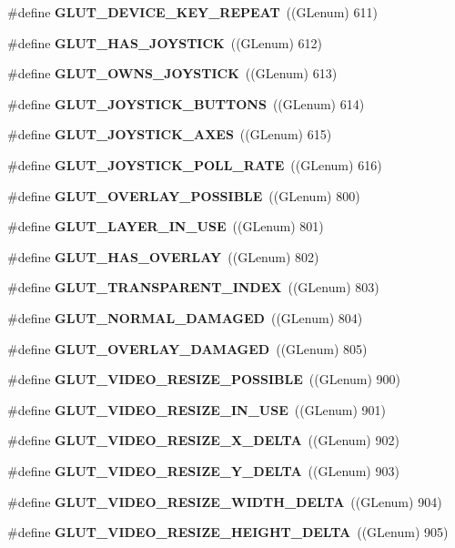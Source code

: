 \begin{DoxyCompactItemize}
\item 
\#define {\bf G\+L\+U\+T\+\_\+\+D\+E\+V\+I\+C\+E\+\_\+\+K\+E\+Y\+\_\+\+R\+E\+P\+E\+AT}~((G\+Lenum) 611)
\item 
\#define {\bf G\+L\+U\+T\+\_\+\+H\+A\+S\+\_\+\+J\+O\+Y\+S\+T\+I\+CK}~((G\+Lenum) 612)
\item 
\#define {\bf G\+L\+U\+T\+\_\+\+O\+W\+N\+S\+\_\+\+J\+O\+Y\+S\+T\+I\+CK}~((G\+Lenum) 613)
\item 
\#define {\bf G\+L\+U\+T\+\_\+\+J\+O\+Y\+S\+T\+I\+C\+K\+\_\+\+B\+U\+T\+T\+O\+NS}~((G\+Lenum) 614)
\item 
\#define {\bf G\+L\+U\+T\+\_\+\+J\+O\+Y\+S\+T\+I\+C\+K\+\_\+\+A\+X\+ES}~((G\+Lenum) 615)
\item 
\#define {\bf G\+L\+U\+T\+\_\+\+J\+O\+Y\+S\+T\+I\+C\+K\+\_\+\+P\+O\+L\+L\+\_\+\+R\+A\+TE}~((G\+Lenum) 616)
\item 
\#define {\bf G\+L\+U\+T\+\_\+\+O\+V\+E\+R\+L\+A\+Y\+\_\+\+P\+O\+S\+S\+I\+B\+LE}~((G\+Lenum) 800)
\item 
\#define {\bf G\+L\+U\+T\+\_\+\+L\+A\+Y\+E\+R\+\_\+\+I\+N\+\_\+\+U\+SE}~((G\+Lenum) 801)
\item 
\#define {\bf G\+L\+U\+T\+\_\+\+H\+A\+S\+\_\+\+O\+V\+E\+R\+L\+AY}~((G\+Lenum) 802)
\item 
\#define {\bf G\+L\+U\+T\+\_\+\+T\+R\+A\+N\+S\+P\+A\+R\+E\+N\+T\+\_\+\+I\+N\+D\+EX}~((G\+Lenum) 803)
\item 
\#define {\bf G\+L\+U\+T\+\_\+\+N\+O\+R\+M\+A\+L\+\_\+\+D\+A\+M\+A\+G\+ED}~((G\+Lenum) 804)
\item 
\#define {\bf G\+L\+U\+T\+\_\+\+O\+V\+E\+R\+L\+A\+Y\+\_\+\+D\+A\+M\+A\+G\+ED}~((G\+Lenum) 805)
\item 
\#define {\bf G\+L\+U\+T\+\_\+\+V\+I\+D\+E\+O\+\_\+\+R\+E\+S\+I\+Z\+E\+\_\+\+P\+O\+S\+S\+I\+B\+LE}~((G\+Lenum) 900)
\item 
\#define {\bf G\+L\+U\+T\+\_\+\+V\+I\+D\+E\+O\+\_\+\+R\+E\+S\+I\+Z\+E\+\_\+\+I\+N\+\_\+\+U\+SE}~((G\+Lenum) 901)
\item 
\#define {\bf G\+L\+U\+T\+\_\+\+V\+I\+D\+E\+O\+\_\+\+R\+E\+S\+I\+Z\+E\+\_\+\+X\+\_\+\+D\+E\+L\+TA}~((G\+Lenum) 902)
\item 
\#define {\bf G\+L\+U\+T\+\_\+\+V\+I\+D\+E\+O\+\_\+\+R\+E\+S\+I\+Z\+E\+\_\+\+Y\+\_\+\+D\+E\+L\+TA}~((G\+Lenum) 903)
\item 
\#define {\bf G\+L\+U\+T\+\_\+\+V\+I\+D\+E\+O\+\_\+\+R\+E\+S\+I\+Z\+E\+\_\+\+W\+I\+D\+T\+H\+\_\+\+D\+E\+L\+TA}~((G\+Lenum) 904)
\item 
\#define {\bf G\+L\+U\+T\+\_\+\+V\+I\+D\+E\+O\+\_\+\+R\+E\+S\+I\+Z\+E\+\_\+\+H\+E\+I\+G\+H\+T\+\_\+\+D\+E\+L\+TA}~((G\+Lenum) 905)

\end{DoxyCompactItemize}
